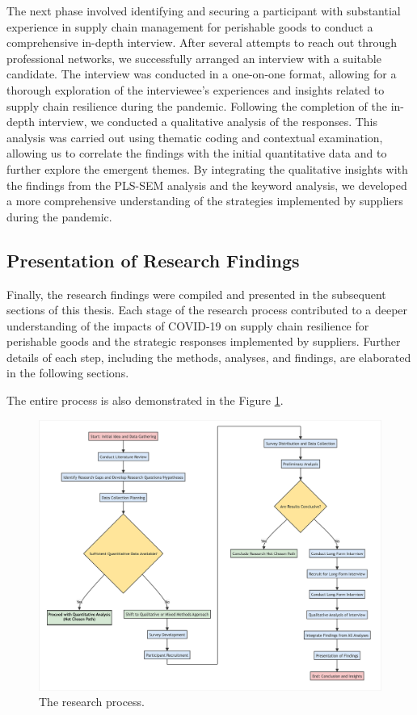 The next phase involved identifying and securing a participant with substantial experience in supply chain management for perishable goods to conduct a comprehensive in-depth interview. After several attempts to reach out through professional networks, we successfully arranged an interview with a suitable candidate. The interview was conducted in a one-on-one format, allowing for a thorough exploration of the interviewee’s experiences and insights related to supply chain resilience during the pandemic. Following the completion of the in-depth interview, we conducted a qualitative analysis of the responses. This analysis was carried out using thematic coding and contextual examination, allowing us to correlate the findings with the initial quantitative data and to further explore the emergent themes. By integrating the qualitative insights with the findings from the PLS-SEM analysis and the keyword analysis, we developed a more comprehensive understanding of the strategies implemented by suppliers during the pandemic.

\subsection{Presentation of Research Findings}

Finally, the research findings were compiled and presented in the subsequent sections of this thesis. Each stage of the research process contributed to a deeper understanding of the impacts of COVID-19 on supply chain resilience for perishable goods and the strategic responses implemented by suppliers. Further details of each step, including the methods, analyses, and findings, are elaborated in the following sections.

\noindent The entire process is also demonstrated in the Figure \ref{fig:research_process}.

\begin{figure}[H]
  \centering
  \includegraphics[width=1\textwidth]{figure/research_process.jpg}
  \caption{The research process.}
  \label{fig:research_process}
\end{figure}

